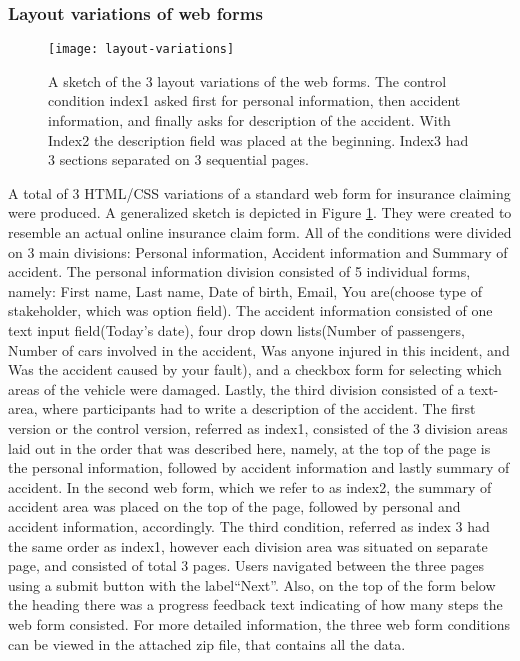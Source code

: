 \documentclass[../main/Feedback.tex]{subfiles}
\begin{document}
\subsubsection{Layout variations of web forms}
\begin{figure}
	\centering
	\texttt{[image: layout-variations]}
	\caption[Sketch of layout variations of the web forms]{A sketch of the 3 layout variations of the web forms. The control condition index1 asked first for personal information, then accident information, and finally asks for description of the accident. With Index2 the description field was placed at the beginning. Index3 had 3 sections separated on 3 sequential pages.}
	\label{fig:layout-variations}
\end{figure}
A total of 3 HTML/CSS variations of a standard web form for insurance claiming were produced. A generalized sketch is depicted in Figure \ref{fig:layout-variations}. They were created to resemble an actual online insurance claim form. All of the conditions were divided on 3 main divisions: Personal information, Accident information and Summary of accident. The personal information division consisted of 5 individual forms, namely: First name, Last name, Date of birth, Email, You are(choose type of stakeholder, which was option field). The accident information consisted of one text input field(Today's date), four drop down lists(Number of passengers, Number of cars involved in the accident, Was anyone injured in this incident, and Was the accident caused by your fault), and a checkbox form for selecting which areas of the vehicle were damaged. Lastly, the third division consisted of a text-area, where participants had to write a description of the accident. The first version or the control version, referred as index1, consisted of the 3 division areas laid out in the order that was described here, namely, at the top of the page is the personal information, followed by accident information and lastly summary of accident. In the second web form, which we refer to as index2, the summary of accident area was placed on the top of the page, followed by personal and accident information, accordingly. The third condition, referred as index 3 had the same order as index1, however each division area was situated on separate page, and consisted of total 3 pages. Users navigated between the three pages using a submit button with the label``Next''. Also, on the top of the form below the heading there was a progress feedback text indicating of how many steps the web form consisted. For more detailed information, the three web form conditions can be viewed in the attached zip file, that contains all the data.
\end{document}
